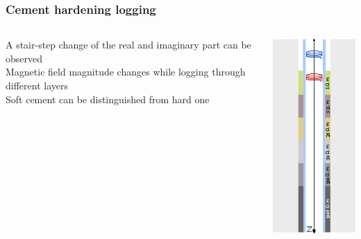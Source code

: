 \documentclass[aspectratio=169]{beamer}
\begin{document}
\begin{frame}
\frametitle{Cement hardening logging}


\begin{columns}[c] 

\begin{small}

A stair-step change of the real and imaginary part can be observed \\
\vspace*{0.2cm}
Magnetic field magnitude changes while logging through different layers \\
\vspace*{0.2cm}
Soft cement can be distinguished from hard one

\end{small}

\includegraphics[scale=1.4]{cement_solid_model.eps}


\end{columns}
\end{frame}
\end{document}
